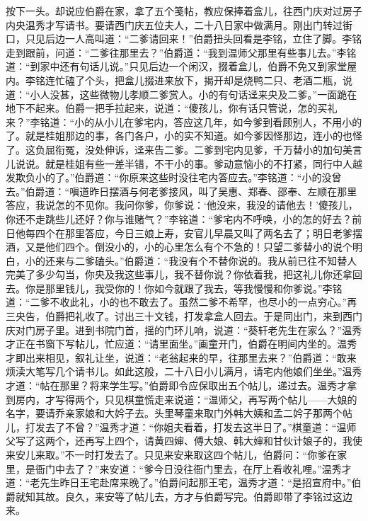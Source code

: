 按下一头。却说应伯爵在家，拿了五个笺帖，教应保捧着盒儿，往西门庆对过房子内央温秀才写请书。要请西门庆五位夫人，二十八日家中做满月。刚出门转过街口，只见后边一人高叫道：“二爹请回来！”伯爵扭头回看是李铭，立住了脚。李铭走到跟前，问道：“二爹往那里去？”伯爵道：“我到温师父那里有些事儿去。”李铭道：“到家中还有句话儿说。”只见后边一个闲汉，掇着盒儿，伯爵不免又到家堂屋内。李铭连忙磕了个头，把盒儿掇进来放下，揭开却是烧鸭二只、老酒二瓶，说道：“小人没甚，这些微物儿孝顺二爹赏人。小的有句话迳来央及二爹。”一面跪在地下不起来。伯爵一把手拉起来，说道：“傻孩儿，你有话只管说，怎的买礼来？”李铭道：“小的从小儿在爹宅内，答应这几年，如今爹到看顾别人，不用小的了。就是桂姐那边的事，各门各户，小的实不知道。如今爹因怪那边，连小的也怪了。这负屈衔冤，没处伸诉，迳来告二爹。二爹到宅内见爹，千万替小的加句美言儿说说。就是桂姐有些一差半错，不干小的事。爹动意恼小的不打紧，同行中人越发欺负小的了。”伯爵道：“你原来这些时没往宅内答应去。”李铭道：“小的没曾去。”伯爵道：“嗔道昨日摆酒与何老爹接风，叫了吴惠、郑春、邵奉、左顺在那里答应，我说怎的不见你。我问你爹，你爹说：‘他没来，我没的请他去！’傻孩儿，你还不走跳些儿还好？你与谁赌气？”李铭道：“爹宅内不呼唤，小的怎的好去？前日他每四个在那里答应，今日三娘上寿，安官儿早晨又叫了两名去了；明日老爹摆酒，又是他们四个。倒没小的，小的心里怎么有个不急的！只望二爹替小的说个明白，小的还来与二爹磕头。”伯爵道：“我没有个不替你说的。我从前已往不知替人完美了多少勾当，你央及我这些事儿，我不替你说？你依着我，把这礼儿你还拿回去。你是那里钱儿，我受你的！你如今就跟了我去，等我慢慢和你爹说。”李铭道：“二爹不收此礼，小的也不敢去了。虽然二爹不希罕，也尽小的一点穷心。”再三央告，伯爵把礼收了。讨出三十文钱，打发拿盒人回去。于是同出门，来到西门庆对门房子里。进到书院门首，摇的门环儿响，说道：“葵轩老先生在家么？”温秀才正在书窗下写帖儿，忙应道：“请里面坐。”画童开门，伯爵在明间内坐的。温秀才即出来相见，叙礼让坐，说道：“老翁起来的早，往那里去来？”伯爵道：“敢来烦渎大笔写几个请书儿。如此这般，二十八日小儿满月，请宅内他娘们坐坐。”温秀才道：“帖在那里？将来学生写。”伯爵即令应保取出五个帖儿，递过去。温秀才拿到房内，才写得两个，只见棋童慌走来说道：“温师父，再写两个帖儿——大娘的名字，要请乔亲家娘和大妗子去。头里琴童来取门外韩大姨和孟二妗子那两个帖儿，打发去了不曾？”温秀才道：“你姐夫看着，打发去这半日了。”棋童道：“温师父写了这两个，还再写上四个，请黄四婶、傅大娘、韩大婶和甘伙计娘子的，我使来安儿来取。”不一时打发去了。只见来安来取这四个帖儿，伯爵问：“你爹在家里，是衙门中去了？”来安道：“爹今日没往衙门里去，在厅上看收礼哩。”温秀才道：“老先生昨日王宅赴席来晚了。”伯爵问起那王宅，温秀才道：“是招宣府中。”伯爵就知其故。良久，来安等了帖儿去，方才与伯爵写完。伯爵即带了李铭过这边来。

